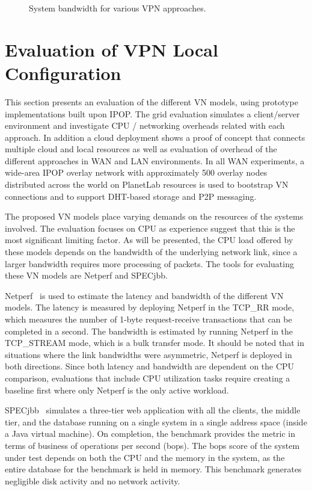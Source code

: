 \begin{figure}
\centering
{}
\caption{System bandwidth for various VPN approaches.}
\label{fig:bandwidth}
\end{figure}

\section{Evaluation of VPN Local Configuration}

This section presents an evaluation of the different VN models, using prototype
implementations built upon IPOP.  The grid evaluation simulates a client/server
environment and investigate CPU / networking overheads related with each
approach.  In addition a cloud deployment shows a proof of concept that
connects multiple cloud and local resources as well as evaluation of overhead
of the different approaches in WAN and LAN environments.  In all WAN
experiments, a wide-area IPOP overlay network with approximately 500 overlay
nodes distributed across the world on PlanetLab resources is used to bootstrap
VN connections and to support DHT-based storage and P2P messaging.

The proposed VN models place varying demands on the resources of the systems
involved. The evaluation focuses on CPU as experience suggest that this is the
most significant limiting factor.  As will be presented, the CPU load offered
by these models depends on the bandwidth of the underlying network link, since
a larger bandwidth requires more processing of packets.  The tools for
evaluating these VN models are Netperf and SPECjbb.

Netperf~\cite{netperf} is used to estimate the latency and bandwidth of the
different VN models. The latency is measured by deploying Netperf in the
TCP\_RR mode, which measures the number of 1-byte request-receive transactions
that can be completed in a second. The bandwidth is estimated by running Netperf
in the TCP\_STREAM mode, which is a bulk transfer mode. It should be noted that
in situations where the link bandwidths were asymmetric, Netperf is deployed in
both directions.  Since both latency and bandwidth are dependent on the CPU
comparison, evaluations that include CPU utilization tasks require creating
a baseline first where only Netperf is the only active workload.

SPECjbb~\cite{specjbb} simulates a three-tier web application with all the
clients, the middle tier, and the database running on a single system in a
single address space (inside a Java virtual machine). On completion, the
benchmark provides the metric in terms of business of operations per second
(bops). The bops score of the system under test depends on both the CPU and the
memory in the system, as the entire database for the benchmark is held in
memory. This benchmark generates negligible disk activity and no network
activity. 

